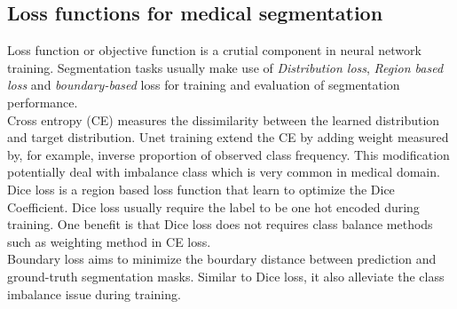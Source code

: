 \subsection{Loss functions for medical segmentation}
Loss function or objective function is a crutial component in neural network training. Segmentation tasks usually make use of \textit{Distribution loss}, \textit{Region based loss} and \textit{boundary-based} loss for training and evaluation of segmentation performance.\\

Cross entropy (CE) measures the dissimilarity between the learned distribution and target distribution. Unet \cite{ronneberger_u-net_2015} training extend the CE by adding weight measured by, for example, inverse proportion of observed class frequency. This modification potentially deal with imbalance class which is very common in medical domain.\\

Dice loss is a region based loss function that learn to optimize the Dice Coefficient. Dice loss usually require the label to be one hot encoded during training. One benefit is that Dice loss does not requires class balance methods such as weighting method in CE loss.\\

Boundary loss aims to minimize the bourdary distance between prediction and ground-truth segmentation masks. Similar to Dice loss, it also alleviate the class imbalance issue during training.